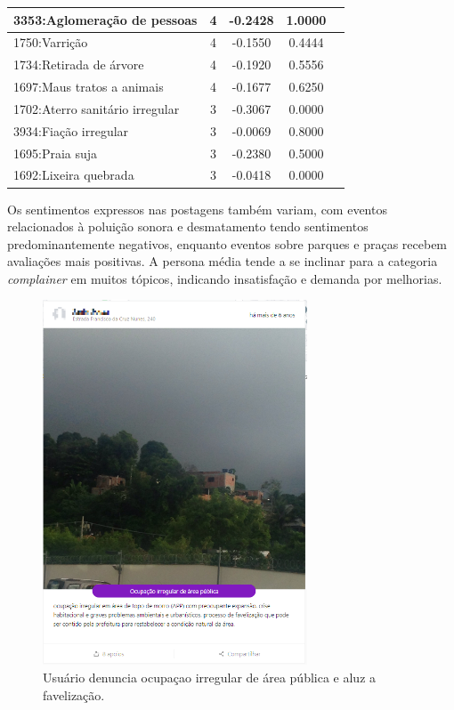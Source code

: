 \begin{table}[htbp]
\begin{tabular}{|l|c|c|c|c|}
		\hline
		3353:Aglomeração de pessoas              & 4                & -0.2428        & 1.0000           \\
		\hline
		1750:Varrição                            & 4                & -0.1550        & 0.4444           \\
		\hline
		1734:Retirada de árvore                  & 4                & -0.1920        & 0.5556           \\
		\hline
		1697:Maus tratos a animais               & 4                & -0.1677        & 0.6250           \\
		\hline
		1702:Aterro sanitário irregular          & 3                & -0.3067        & 0.0000           \\
		\hline
		3934:Fiação irregular                    & 3                & -0.0069        & 0.8000           \\
		\hline
		1695:Praia suja                          & 3                & -0.2380        & 0.5000           \\
		\hline
		1692:Lixeira quebrada                    & 3                & -0.0418        & 0.0000           \\
		\hline
	\end{tabular}
\end{table}

Os sentimentos expressos nas postagens também variam, com eventos relacionados à poluição sonora e desmatamento tendo sentimentos predominantemente negativos, enquanto eventos sobre parques e praças recebem avaliações mais positivas. A persona média tende a se inclinar para a categoria \textit{complainer} em muitos tópicos, indicando insatisfação e demanda por melhorias.

\begin{figure}[htb]
	\centering
	\includegraphics[width=0.7\textwidth]{images/colab_posts_social_favelizacao.png}
	\caption{Usuário denuncia ocupaçao irregular de área pública e aluz a favelização.}
	\label{fig:colab_posts_social_favelizacao}
\end{figure}


